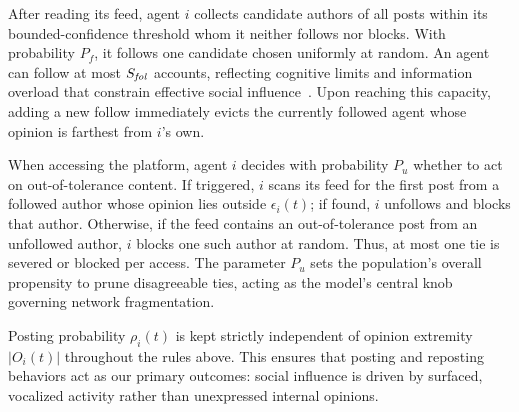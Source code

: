 \documentclass{svproc}
\def\post{\rho}                 %
\def\BoundedConfidence{\epsilon} %
\def\maxfollower{S_{\it fol}}    %
\begin{document}
After reading its feed, agent $i$ collects candidate authors of all
posts within its bounded-confidence threshold whom it neither follows
nor blocks. With probability $P_f$, it follows one candidate chosen
uniformly at random. An agent can follow at most $\maxfollower$
accounts, reflecting cognitive limits and information overload that
constrain effective social
influence~\cite{goncalves2011,weng2012}. Upon reaching this capacity,
adding a new follow immediately evicts the currently followed agent
whose opinion is farthest from $i$'s own.
\par


When accessing the platform, agent $i$ decides with probability $P_u$
whether to act on out-of-tolerance content. If triggered, $i$ scans
its feed for the first post from a followed author whose opinion lies
outside $\BoundedConfidence_i(t)$; if found, $i$ unfollows and blocks
that author. Otherwise, if the feed contains an out-of-tolerance post
from an unfollowed author, $i$ blocks one such author at random. Thus,
at most one tie is severed or blocked per access. The parameter $P_u$
sets the population's overall propensity to prune disagreeable ties,
acting as the model's central knob governing network fragmentation.
\par

Posting probability $\post_i(t)$ is kept strictly independent of
opinion extremity $\vert O_i(t)\vert$ throughout the rules above. This
ensures that posting and reposting behaviors act as our primary
outcomes: social influence is driven by surfaced, vocalized activity
rather than unexpressed internal opinions.
\par
\end{document}
